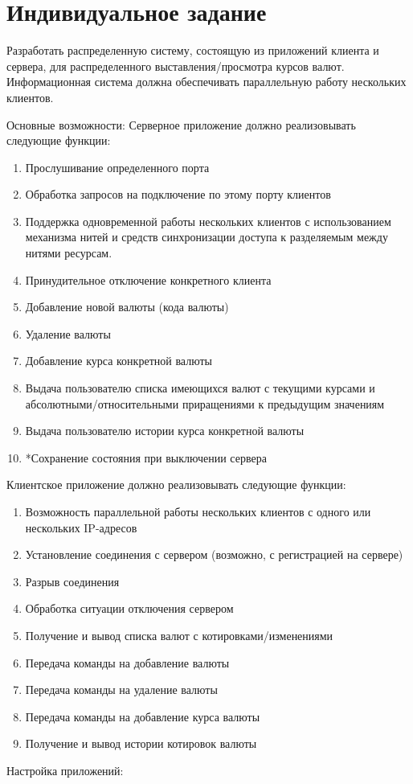 \documentclass[a4paper,14pt]{article}
\begin{document}
\section{Индивидуальное задание}
Разработать распределенную систему, состоящую из приложений клиента и сервера, для распределенного выставления/просмотра курсов валют. Информационная система должна обеспечивать параллельную работу нескольких клиентов.

Основные возможности:
Серверное приложение должно реализовывать следующие функции:
\begin{enumerate}
\item Прослушивание определенного порта
\item Обработка запросов на подключение по этому порту клиентов
\item Поддержка одновременной работы нескольких клиентов с использованием механизма нитей и средств синхронизации доступа к разделяемым между нитями ресурсам.
\item Принудительное отключение конкретного клиента
\item Добавление новой валюты (кода валюты)
\item Удаление валюты
\item Добавление курса конкретной валюты
\item Выдача пользователю списка имеющихся валют с текущими курсами и абсолютными/относительными приращениями к предыдущим значениям
\item Выдача пользователю истории курса конкретной валюты
\item *Сохранение состояния при выключении сервера
\end{enumerate}
Клиентское приложение должно реализовывать следующие функции:
	\begin{enumerate}
\item Возможность параллельной работы нескольких клиентов с одного или нескольких IP-адресов
\item Установление соединения с сервером (возможно, с регистрацией на сервере)
\item Разрыв соединения
\item Обработка ситуации отключения сервером
\item Получение и вывод списка валют с котировками/изменениями
\item Передача команды на добавление валюты
\item Передача команды на удаление валюты
\item Передача команды на добавление курса валюты
\item Получение и вывод истории котировок валюты
\end{enumerate}
Настройка приложений:
\end{document}
